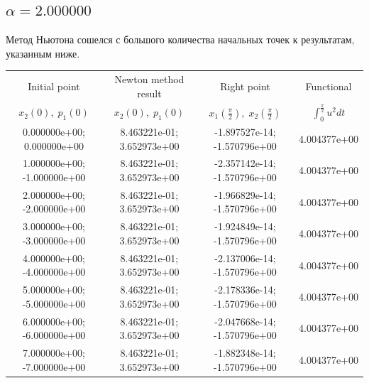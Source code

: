 \documentclass[titlepage]{article}
\def\l{\left}
\def\r{\right}
\begin{document}
\subsection{$\alpha = 2.000000$} 
Метод Ньютона сошелся с большого количества начальных точек к результатам, указанным ниже. \\ 
\begin{tabular}{ | c | c | c | c |} 
\hline 
Initial point  & Newton method result & Right point & Functional 
 \\ $x_2(0), \; p_1(0)$ & $x_2(0), \; p_1(0)$ & $x_1\l(\frac{\pi}{2}\r), \; x_2\l(\frac{\pi}{2}\r)$ & $\int_{0}^{\frac{\pi}{2}}u^2dt$  \\ \hline 
0.000000e+00; 0.000000e+00 & 8.463221e-01; 3.652973e+00 & -1.897527e-14; -1.570796e+00 & 4.004377e+00 \\ \hline 
1.000000e+00; -1.000000e+00 & 8.463221e-01; 3.652973e+00 & -2.357142e-14; -1.570796e+00 & 4.004377e+00 \\ \hline 
2.000000e+00; -2.000000e+00 & 8.463221e-01; 3.652973e+00 & -1.966829e-14; -1.570796e+00 & 4.004377e+00 \\ \hline 
3.000000e+00; -3.000000e+00 & 8.463221e-01; 3.652973e+00 & -1.924849e-14; -1.570796e+00 & 4.004377e+00 \\ \hline 
4.000000e+00; -4.000000e+00 & 8.463221e-01; 3.652973e+00 & -2.137006e-14; -1.570796e+00 & 4.004377e+00 \\ \hline 
5.000000e+00; -5.000000e+00 & 8.463221e-01; 3.652973e+00 & -2.178336e-14; -1.570796e+00 & 4.004377e+00 \\ \hline 
6.000000e+00; -6.000000e+00 & 8.463221e-01; 3.652973e+00 & -2.047668e-14; -1.570796e+00 & 4.004377e+00 \\ \hline 
7.000000e+00; -7.000000e+00 & 8.463221e-01; 3.652973e+00 & -1.882348e-14; -1.570796e+00 & 4.004377e+00 \\ \hline 
\end{tabular} 
\end{document}
